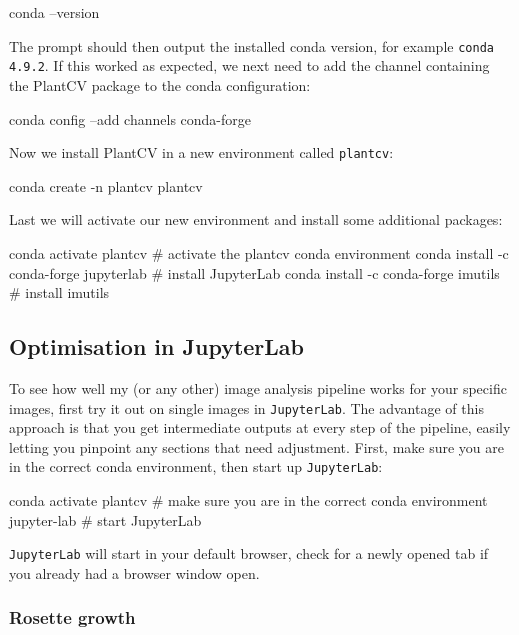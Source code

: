 \documentclass[10pt]{article}
\begin{document}
 \begin{bashcode}
 	conda --version
 \end{bashcode}

The prompt should then output the installed conda version, for example \texttt{conda 4.9.2}. If this worked as expected, we next need to add the channel containing the PlantCV package to the conda configuration:

\begin{bashcode}
	conda config --add channels conda-forge
\end{bashcode}

Now we install PlantCV in a new environment called \texttt{plantcv}:

\begin{bashcode}
	conda create -n plantcv plantcv
\end{bashcode}

Last we will activate our new environment and install some additional packages:

\begin{bashcode}
	conda activate plantcv # activate the plantcv conda environment
	conda install -c conda-forge jupyterlab # install JupyterLab
	conda install -c conda-forge imutils # install imutils
\end{bashcode}

\subsection{Optimisation in JupyterLab}

To see how well my (or any other) image analysis pipeline works for your specific images, first try it out on single images in \texttt{JupyterLab}. The advantage of this approach is that you get intermediate outputs at every step of the pipeline, easily letting you pinpoint any sections that need adjustment. First, make sure you are in the correct conda environment, then start up \texttt{JupyterLab}:

\begin{bashcode}
	conda activate plantcv # make sure you are in the correct conda environment
	jupyter-lab # start JupyterLab
\end{bashcode}

\texttt{JupyterLab} will start in your default browser, check for a newly opened tab if you already had a browser window open.

\subsubsection{Rosette growth}
\end{document}

